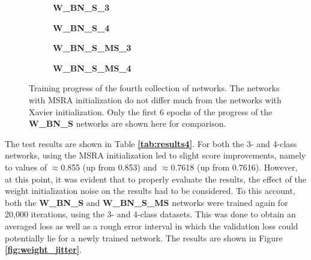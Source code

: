 \begin {figure}[!htb]
	\begin {subfigure}[b]{0.4\linewidth}
		\scalebox{0.65}{}
		\caption{\textbf{W\_BN\_S\_3}}
	\end {subfigure}\hspace{1.75cm}
	\begin {subfigure}[b]{0.4\linewidth}
		\scalebox{0.65}{}
		\caption{\textbf{W\_BN\_S\_4}}
	\end {subfigure}

	\begin {subfigure}[b]{0.4\linewidth}
		\scalebox{0.65}{}
		\caption{\textbf{W\_BN\_S\_MS\_3}}
	\end {subfigure}\hspace{1.75cm}
	\begin {subfigure}[b]{0.4\linewidth}
		\scalebox{0.65}{}
		\caption{\textbf{W\_BN\_S\_MS\_4}}
	\end {subfigure}

		\caption[Training progress of the fourth collection of networks.]{Training progress of the fourth collection of networks. The networks with MSRA initialization do not differ much from the networks with Xavier initialization. Only the first 6 epochs of the progress of the \textbf{W\_BN\_S} networks are shown here for comparison.}
		\label{fig:weighted_batchnorm_shuffle_msra_training}
\end {figure}


The test results are shown in Table \textbf{\ref{tab:results4}}. For both the 3- and 4-class networks, using the MSRA initialization led to slight score improvements, namely to values of $\approx$0.855 (up from 0.853) and $\approx$0.7618 (up from 0.7616). However, at this point, it was evident that to properly evaluate the results, the effect of the weight initialization noise on the results had to be considered. To this account, both the \textbf {W\_BN\_S} and \textbf{W\_BN\_S\_MS} networks were trained again for 20,000 iterations, using the 3- and 4-class datasets. This was done to obtain an averaged loss as well as a rough error interval in which the validation loss could potentially lie for a newly trained network. The results are shown in Figure \textbf{\ref{fig:weight_jitter}}.

